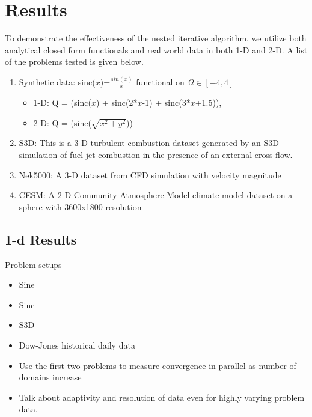 
\section{Results}

To demonstrate the effectiveness of the nested iterative algorithm, we utilize both analytical closed form functionals and real world data in both 1-D and 2-D. A list of the problems tested is given below.


\begin{enumerate}
	\item Synthetic data: sinc($x$)=$\frac{sin(x)}{x}$ functional on $\Omega \in [-4, 4]$
	\begin{itemize}
		\item 1-D: Q = (sinc($x$) + sinc(2*$x$-1) + sinc(3*$x$+1.5)), 
		\item 2-D: Q = (sinc($\sqrt{x^2+y^2}$))
	\end{itemize}
	\item S3D: This is a 3-D turbulent combustion dataset generated by an S3D simulation \cite{chen-s3d-2009} of fuel jet combustion in the presence of an external cross-flow. 
	\item Nek5000: A 3-D dataset from CFD simulation with velocity magnitude 
	\item CESM: A 2-D Community Atmosphere Model climate model dataset on a sphere with 3600x1800 resolution
\end{enumerate}



\subsection{1-d Results}\label{AA}

Problem setups
\begin{itemize}
  \item Sine
  \item Sinc
  \item S3D
  \item Dow-Jones historical daily data
\end{itemize}

\begin{itemize}
	\item Use the first two problems to measure convergence in parallel as number of domains increase
	\item Talk about adaptivity and resolution of data even for highly varying problem data.
\end{itemize}

